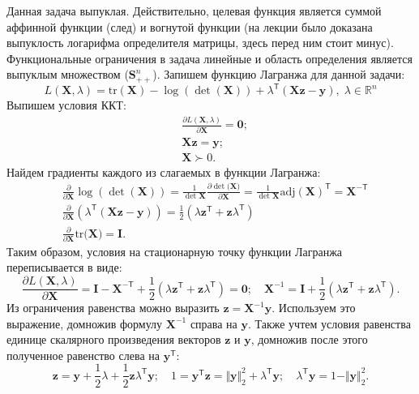 \documentclass[a4paper,12pt]{article}
\renewcommand{\top}{\mathsf{T}}
\newcommand{\tr}{\text{tr}}
\begin{document}
\begin{enumerate}
	Данная задача выпуклая. Действительно, целевая функция является суммой аффинной функции (след) и вогнутой функции (на лекции было доказана выпуклость логарифма определителя матрицы, здесь перед ним стоит минус). Функциональные ограничения в задача линейные и область определения является выпуклым множеством ($\mathbf{S}_{++}^n$).  Запишем функцию Лагранжа для данной задачи:
	$$
	L(\mathbf{X}, \lambda) = \tr(\mathbf{X}) - \log(\det(\mathbf{X})) + \lambda^\top (\mathbf{X}\mathbf{z} - \mathbf{y}),\; \lambda \in \mathbb{R}^n
	$$ 
	Выпишем условия ККТ:
	\begin{equation*}
	\begin{aligned}
		&\frac{\partial L(\mathbf{X}, \lambda)}{\partial \mathbf{X}} = \mathbf{0};\\
		&\mathbf{X}\mathbf{z} = \mathbf{y};\\
		&\mathbf{X} \succ 0.
	\end{aligned}
	\end{equation*}
	Найдем градиенты  каждого из слагаемых в функции Лагранжа:
	\begin{equation*}
	\begin{aligned}
	&\frac{\partial}{\partial \mathbf{X}} \log(\det(\mathbf{X})) = 
	\frac{1}{\det\mathbf{X}} \frac{\partial \det{(\mathbf{X}})}{\partial \mathbf{X}} = \frac{1}{\det\mathbf{X}} \text{adj}(\mathbf{X})^\top = \mathbf{X}^{-\top}\\
	&\frac{\partial}{\partial \mathbf{X}}  (\lambda^\top (\mathbf{X}\mathbf{z} - \mathbf{y})) = \frac{1}{2} (\lambda \mathbf{z}^\top + \mathbf{z}\lambda^\top)\\
	&\frac{\partial}{\partial \mathbf{X}} \tr{(\mathbf{X}}) = \mathbf{I}.
	\end{aligned}
	\end{equation*}
	Таким образом, условия на стационарную точку функции Лагранжа переписывается в виде:
	$$
	\frac{\partial L(\mathbf{X}, \lambda)}{\partial \mathbf{X}} = \mathbf{I} - \mathbf{X}^{-\top} + \frac{1}{2} (\lambda \mathbf{z}^\top + \mathbf{z}\lambda^\top) = \mathbf{0};\quad \mathbf{X}^{-1} = \mathbf{I} + \frac{1}{2} (\lambda \mathbf{z}^\top + \mathbf{z}\lambda^\top).
	$$
	Из ограничения равенства можно выразить $\mathbf{z} = \mathbf{X}^{-1}\mathbf{y}$. Используем это выражение, домножив формулу $\mathbf{X}^{-1}$ справа на $\mathbf{y}$. Также учтем условия равенства единице скалярного произведения векторов $\mathbf{z}$ и $\mathbf{y}$, домножив после этого полученное равенство слева на $\mathbf{y}^\top$: 
	$$
	\mathbf{z} = \mathbf{y} + \frac{1}{2}\lambda +\frac{1}{2} \mathbf{z}\lambda^\top\mathbf{y};\quad  1 = \mathbf{y}^\top \mathbf{z} = \Vert \mathbf{y} \Vert_2^2 + \lambda^\top \mathbf{y};\quad \lambda^\top \mathbf{y} =  1 - \Vert \mathbf{y} \Vert_2^2.
$$
\end{enumerate}
\end{document}
